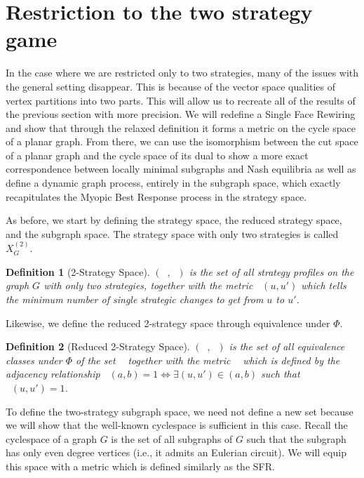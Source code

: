 \documentclass{article}
\newtheorem{definition}{Definition}[section]
\DeclareMathOperator{\Xt}{X_G^{(2)}}
\DeclareMathOperator{\dXt}{d_{X}^{(2)}}
\DeclareMathOperator{\At}{\mathcal{A}_{G}^{(2)}}
\DeclareMathOperator{\dAt}{d_{\mathcal{A}}^{(2)}}
\begin{document}
\section{Restriction to the two strategy game}\label{sec:mbr}
    In the case where we are restricted only to two strategies, many of the issues with the general setting disappear. This is because of the vector space qualities of vertex partitions into two parts. This will allow us to recreate all of the results of the previous section with more precision. We will redefine a Single Face Rewiring and show that through the relaxed definition it forms a metric on the cycle space of a planar graph. From there, we can use the isomorphism between the cut space of a planar graph and the cycle space of its dual to show a more exact correspondence between locally minimal subgraphs and Nash equilibria as well as define a dynamic graph process, entirely in the subgraph space, which exactly recapitulates the Myopic Best Response process in the strategy space. 

    As before, we start by defining the strategy space, the reduced strategy space, and the subgraph space. The strategy space with only two strategies is called $X^{(2)}_G$.
    \begin{definition}[2-Strategy Space]
        $(\Xt,\dXt)$ is the set of all strategy profiles on the graph $G$ with only two strategies, together with the metric $\dXt(u,u')$ which tells the minimum number of single strategic changes to get from $u$ to $u'$.
    \end{definition}
    Likewise, we define the reduced 2-strategy space through equivalence under $\Phi$. 
    \begin{definition}[Reduced 2-Strategy Space]
        $(\At,\dAt)$ is the set of all equivalence classes under $\Phi$ of the set $\Xt$ together with the metric $\dAt$ which is defined by the adjacency relationship $\dAt(a,b)=1\iff \exists (u,u')\in (a,b)$ such that $\dXt(u,u')=1$.
    \end{definition}

    To define the two-strategy subgraph space, we need not define a new set because we will show that the well-known cyclespace is sufficient in this case. Recall the cyclespace of a graph $G$ is the set of all subgraphs of $G$ such that the subgraph has only even degree vertices (i.e., it admits an Eulerian circuit). We will equip this space with a metric which is defined similarly as the SFR.
\end{document}
